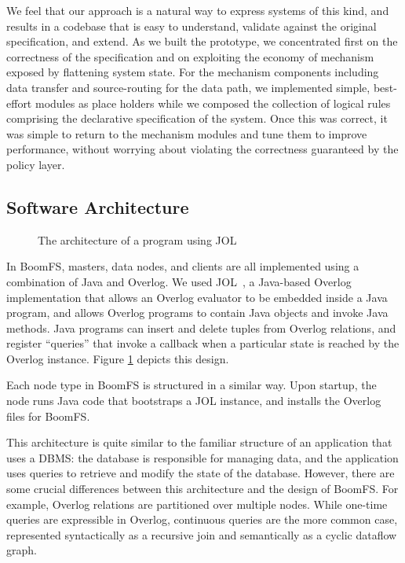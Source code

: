 \documentclass{article}
\begin{document}
We feel that our approach is a natural way to express systems of this
kind, and results in a codebase that is easy to understand, validate
against the original specification, and extend.  As we built the
prototype, we concentrated first on the correctness of the
specification and on exploiting the economy of mechanism exposed by
flattening system state.  For the mechanism components including data
transfer and source-routing for the data path, we implemented simple,
best-effort modules as place holders while we composed the collection
of logical rules comprising the declarative specification of the
system.  Once this was correct, it was simple to return to the
mechanism modules and tune them to improve performance, without
worrying about violating the correctness guaranteed by the policy
layer.

\subsection{Software Architecture}
\begin{figure}
\centering
{}
\caption{The architecture of a program using JOL}
\label{fig:jol-arch}
\end{figure}


In BoomFS, masters, data nodes, and clients are all implemented using
a combination of Java and Overlog. We used JOL~\cite{jol}, a
Java-based Overlog implementation that allows an Overlog evaluator to
be embedded inside a Java program, and allows Overlog programs to
contain Java objects and invoke Java methods. Java programs can insert
and delete tuples from Overlog relations, and register ``queries''
that invoke a callback when a particular state is reached by the
Overlog instance. Figure \ref{fig:jol-arch} depicts this design.

Each node type in BoomFS is structured in a similar way. Upon startup,
the node runs Java code that bootstraps a JOL instance, and installs
the Overlog files for BoomFS.

This architecture is quite similar to the familiar structure of an
application that uses a DBMS: the database is responsible for managing
data, and the application uses queries to retrieve and modify the
state of the database. However, there are some crucial differences
between this architecture and the design of BoomFS. For example,
Overlog relations are partitioned over multiple nodes.  While one-time
queries are expressible in Overlog, continuous queries are the more
common case, represented syntactically as a recursive join and
semantically as a cyclic dataflow graph.
\end{document}
